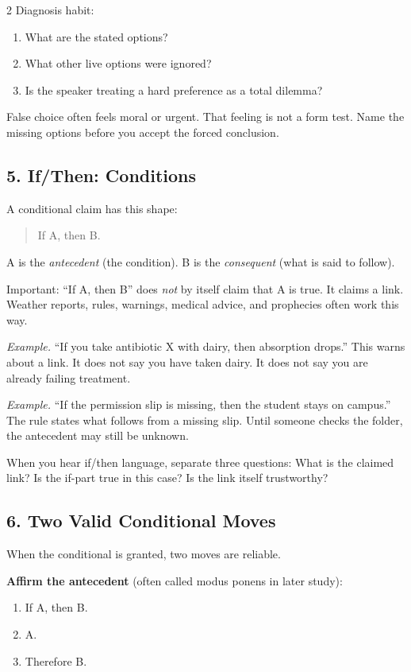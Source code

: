 \documentclass[12pt]{article}
\newcommand{\exbox}[1]{\par\vspace{0.2em}\noindent\textit{Example.} #1\par\vspace{0.15em}}
\begin{document}
\begin{multicols}{2}
Diagnosis habit:
\begin{enumerate}[leftmargin=*,itemsep=0.08em]
\item What are the stated options?
\item What other live options were ignored?
\item Is the speaker treating a hard preference as a total dilemma?
\end{enumerate}

False choice often feels moral or urgent. That feeling is not a form test. Name the missing options before you accept the forced conclusion.

\subsection*{5. If/Then: Conditions}
A conditional claim has this shape:
\begin{quote}
If A, then B.
\end{quote}

A is the \textit{antecedent} (the condition). B is the \textit{consequent} (what is said to follow).

Important: ``If A, then B'' does \textit{not} by itself claim that A is true. It claims a link. Weather reports, rules, warnings, medical advice, and prophecies often work this way.

\exbox{``If you take antibiotic X with dairy, then absorption drops.'' This warns about a link. It does not say you have taken dairy. It does not say you are already failing treatment.}

\exbox{``If the permission slip is missing, then the student stays on campus.'' The rule states what follows from a missing slip. Until someone checks the folder, the antecedent may still be unknown.}

When you hear if/then language, separate three questions: What is the claimed link? Is the if-part true in this case? Is the link itself trustworthy?

\subsection*{6. Two Valid Conditional Moves}
When the conditional is granted, two moves are reliable.

\textbf{Affirm the antecedent} (often called modus ponens in later study):
\begin{enumerate}[leftmargin=*,itemsep=0.08em]
\item If A, then B.
\item A.
\item Therefore B.
\end{enumerate}


\end{multicols}
\end{document}
